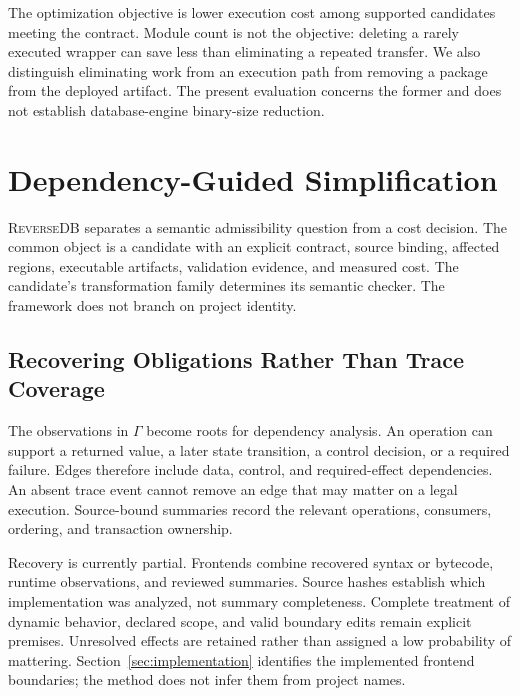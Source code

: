 \documentclass[acmsmall,screen,review,anonymous]{acmart}
\newcommand{\sys}{\textsc{ReverseDB}}
\begin{document}
The optimization objective is lower execution cost among supported candidates
meeting the contract. Module count is not the objective: deleting a rarely
executed wrapper can save less than eliminating a repeated transfer. We also
distinguish eliminating work from an execution path from removing a package
from the deployed artifact. The present evaluation concerns the former and
does not establish database-engine binary-size reduction.

\section{Dependency-Guided Simplification}
\label{sec:method}
\sys{} separates a semantic admissibility question from a cost decision.
The common object is a candidate with an explicit contract, source binding,
affected regions, executable artifacts, validation evidence, and measured cost.
The candidate's transformation family determines its semantic checker. The
framework does not branch on project identity.

\subsection{Recovering Obligations Rather Than Trace Coverage}
\label{sec:recovery}
The observations in $\Gamma$ become roots for dependency analysis. An operation
can support a returned value, a later state transition, a control decision, or
a required failure. Edges therefore include data, control, and required-effect
dependencies. An absent trace event cannot remove an edge that may matter on a
legal execution. Source-bound summaries record the relevant operations,
consumers, ordering, and transaction ownership.

Recovery is currently partial. Frontends combine recovered syntax or bytecode,
runtime observations, and reviewed summaries. Source hashes establish which
implementation was analyzed, not summary completeness. Complete treatment of
dynamic behavior, declared scope, and valid boundary edits remain explicit
premises. Unresolved effects are retained rather than assigned a low probability
of mattering. Section~\ref{sec:implementation} identifies the implemented
frontend boundaries; the method does not infer them from project names.
\end{document}
